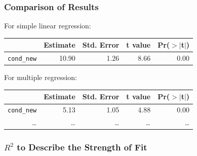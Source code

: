 \documentclass[handout]{beamer}
\newcommand{\blue}[1]{\textcolor{blue2}{#1}}
\begin{document}
\begin{frame}[fragile]
\frametitle{Comparison of Results}

For simple linear regression:
\begin{table}[ht]
\centering
\begin{tabular}{r|rrrr}
  \hline
 & Estimate & Std. Error & t value & Pr($>$$|$t$|$) \\ 
  \hline
{\tt cond\_new} & 10.90 & 1.26 & 8.66 & 0.00 \\ 
   \hline
\end{tabular}
\end{table}
\pause
For multiple regression:
\begin{table}[ht]
\centering
\begin{tabular}{r|rrrr}
  \hline
 & Estimate & Std. Error & t value & Pr($>$$|$t$|$) \\ 
  \hline
{\tt cond\_new} & 5.13 & 1.05 & 4.88 & 0.00 \\ 
\ldots & \ldots & \ldots & \ldots & \ldots \\   
   \hline
\end{tabular}
\end{table}
\end{frame}


%
%
%
%
%
%


\begin{frame}[fragile]
\frametitle{$R^2$ to Describe the Strength of Fit}
%
%
%
%

\end{frame}
\end{document}
